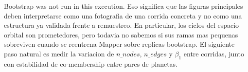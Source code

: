 Bootstrap was not run in this execution. Eso significa que las figuras principales deben interpretarse como una fotografia de una corrida concreta y no como una estructura ya validada frente a remuestreo. En particular, los ciclos del espacio orbital son prometedores, pero todavia no sabemos si sus ramas mas pequenas sobreviven cuando se reentrena Mapper sobre replicas bootstrap. El siguiente paso natural es medir la variacion de $n\_nodes$, $n\_edges$ y $\beta_1$ entre corridas, junto con estabilidad de co-membership entre pares de planetas.
